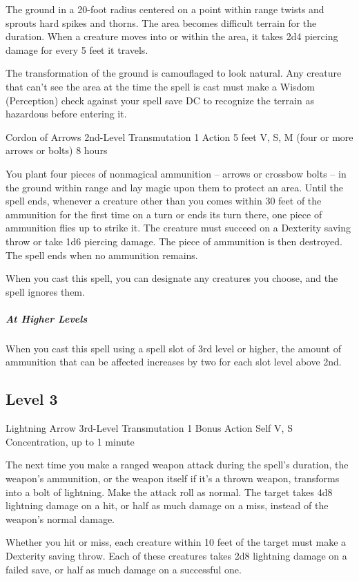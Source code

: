 \documentclass[letterpaper,openany,oneside,twocolumn]{book}
\begin{document}
The ground in a 20-foot radius centered on a point within range twists and sprouts hard spikes and thorns. The area becomes difficult terrain for the duration. When a creature moves into or within the area, it takes 2d4 piercing damage for every 5 feet it travels.

The transformation of the ground is camouflaged to look natural. Any creature that can't see the area at the time the spell is cast must make a Wisdom (Perception) check against your spell save DC to recognize the terrain as hazardous before entering it.

\DndSpellHeader
  {Cordon of Arrows}
  {2nd-Level Transmutation}
  {1 Action}
  {5 feet}
  {V, S, M (four or more arrows or bolts)}
  {8 hours}

You plant four pieces of nonmagical ammunition – arrows or crossbow bolts – in the ground within range and lay magic upon them to protect an area. Until the spell ends, whenever a creature other than you comes within 30 feet of the ammunition for the first time on a turn or ends its turn there, one piece of ammunition flies up to strike it. The creature must succeed on a Dexterity saving throw or take 1d6 piercing damage. The piece of ammunition is then destroyed. The spell ends when no ammunition remains.

When you cast this spell, you can designate any creatures you choose, and the spell ignores them.

\subparagraph{At Higher Levels} When you cast this spell using a spell slot of 3rd level or higher, the amount of ammunition that can be affected increases by two for each slot level above 2nd.

\subsection*{Level 3}

\DndSpellHeader
  {Lightning Arrow}
  {3rd-Level Transmutation}
  {1 Bonus Action}
  {Self}
  {V, S}
  {Concentration, up to 1 minute}

The next time you make a ranged weapon attack during the spell's duration, the weapon's ammunition, or the weapon itself if it's a thrown weapon, transforms into a bolt of lightning. Make the attack roll as normal. The target takes 4d8 lightning damage on a hit, or half as much damage on a miss, instead of the weapon's normal damage.

Whether you hit or miss, each creature within 10 feet of the target must make a Dexterity saving throw. Each of these creatures takes 2d8 lightning damage on a failed save, or half as much damage on a successful one.
\end{document}

